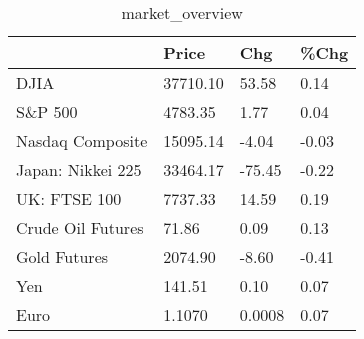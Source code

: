 \documentclass{article}%
\begin{document}
%


\begin{table}[htbp]%
\caption{market\_overview}%
\centering%
\begin{adjustbox}{width=1\textwidth}%
\begin{tabular}{llll}
\toprule
                  &    Price &    Chg &  \%Chg \\
\midrule
             DJIA & 37710.10 &  53.58 &  0.14 \\
          S\&P 500 &  4783.35 &   1.77 &  0.04 \\
 Nasdaq Composite & 15095.14 &  -4.04 & -0.03 \\
Japan: Nikkei 225 & 33464.17 & -75.45 & -0.22 \\
     UK: FTSE 100 &  7737.33 &  14.59 &  0.19 \\
Crude Oil Futures &    71.86 &   0.09 &  0.13 \\
     Gold Futures &  2074.90 &  -8.60 & -0.41 \\
              Yen &   141.51 &   0.10 &  0.07 \\
             Euro &   1.1070 & 0.0008 &  0.07 \\
\bottomrule
\end{tabular}
%
\end{adjustbox}%
\end{table}

%
\end{document}
